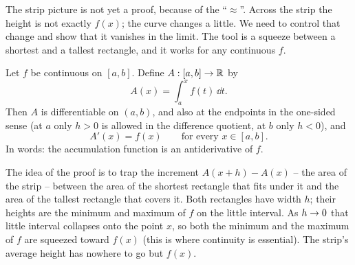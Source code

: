 The strip picture is not yet a proof, because of the ``$\approx$''. Across the
strip the height is not exactly $f(x)$; the curve changes a little. We need to
control that change and show that it vanishes in the limit. The tool is a squeeze
between a shortest and a tallest rectangle, and it works for any continuous $f$.

\begin{theorem}\label{ch21:thm-ftc1}
Let $f$ be continuous on $[a,b]$. Define $A:[a,b]\to\mathbb{R}$ by
\[
  A(x) = \int_a^x f(t)\,\dd t .
\]
Then $A$ is differentiable on $(a,b)$, and also at the endpoints in the one-sided
sense (at $a$ only $h>0$ is allowed in the difference quotient, at $b$ only
$h<0$), and
\[
  A'(x) = f(x) \qquad\text{for every } x\in[a,b] .
\]
In words: the accumulation function is an antiderivative of $f$.
\end{theorem}

\begin{intuitionbox}
The idea of the proof is to trap the increment $A(x+h)-A(x)$ -- the area of the
strip -- between the area of the shortest rectangle that fits under it and the
area of the tallest rectangle that covers it. Both rectangles have width $h$;
their heights are the minimum and maximum of $f$ on the little interval. As
$h\to 0$ that little interval collapses onto the point $x$, so both the minimum
and the maximum of $f$ are squeezed toward $f(x)$ (this is where continuity is
essential). The strip's average height has nowhere to go but $f(x)$.
\end{intuitionbox}

